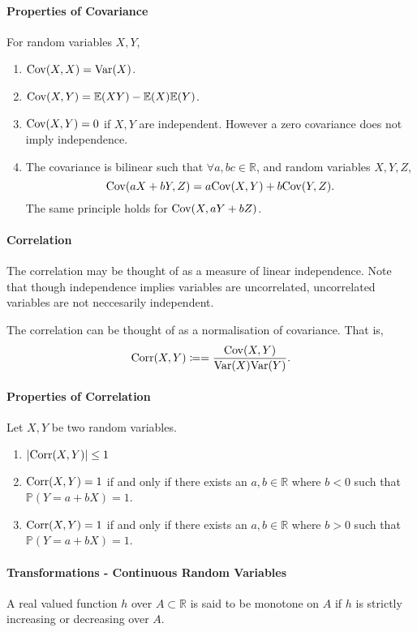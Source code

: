 \paragraph{Properties of Covariance}
For random variables \(X, Y\),
 \begin{enumerate}
    \item \(\mathrm{Cov}(X, X) = \mathrm{Var}(X)\).
    \item \( \mathrm{Cov}(X, Y) = \mathbb{E}(XY) - \mathbb{E}(X) \mathbb{E}(Y) \).
    \item \( \mathrm{Cov}(X, Y) = 0 \) if  \( X, Y \) are independent. However
        a zero covariance does not imply independence.
    \item The covariance is bilinear such that
        \( \forall a, b c \in\mathbb{R} \), and random variables \( X, Y, Z \),
         \[
            \mathrm{Cov}(aX + bY, Z) = a\mathrm{Cov}(X, Y) + b\mathrm{Cov}(Y, Z)
        .\]
        The same principle holds for \( \mathrm{Cov}(X, aY+ bZ) \).
\end{enumerate}

\paragraph{Correlation}
The correlation may be thought of as a measure of linear independence.
Note that though independence implies variables are uncorrelated,
uncorrelated variables are not neccesarily independent.

The correlation can be thought of as a normalisation of covariance.
That is, \[
    \mathrm{Corr}(X, Y) \coloneqq
    = \frac{\mathrm{Cov}(X, Y)}{\mathrm{Var}(X) \mathrm{Var}(Y)}
.\]

\paragraph{Properties of Correlation}
Let \( X, Y \) be two random variables.
\begin{enumerate}
    \item \( |\mathrm{Corr}(X, Y)| \leq 1 \)
    \item \( \mathrm{Corr}(X, Y) = 1 \) if and only if there exists an
         \( a, b \in \mathbb{R} \) where \( b < 0 \) such that
         \( \mathbb{P}(Y = a + bX) = 1\).
    \item \( \mathrm{Corr}(X, Y) = 1 \) if and only if there exists an
         \( a, b \in \mathbb{R} \) where \( b > 0 \) such that
         \( \mathbb{P}(Y = a + bX) = 1\).
\end{enumerate}

\paragraph{Transformations - Continuous Random Variables}
A real valued function \( h \) over \( A \subset \mathbb{R} \) 
is said to be monotone on \( A \) if \( h \) is strictly increasing
or decreasing over \( A \).

